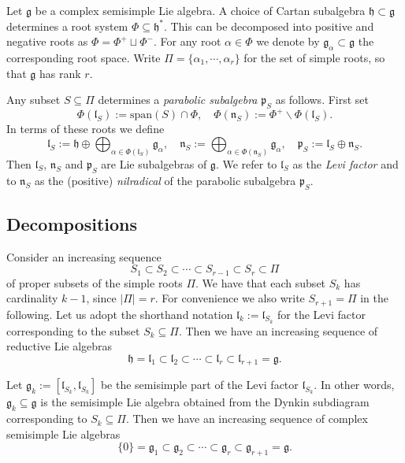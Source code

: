 \documentclass[a4paper, 12pt, reqno, english]{amsart}
\numberwithin{equation}{section}
\numberwithin{figure}{section}
\theoremstyle{plain}
\theoremstyle{plain}
\theoremstyle{plain}
\theoremstyle{plain}
\theoremstyle{plain}
\theoremstyle{definition}
\theoremstyle{definition}
\theoremstyle{definition}
\theoremstyle{remark}
\theoremstyle{definition}
\theoremstyle{definition}
\newcommand{\lieg}{\mathfrak{g}}
\newcommand{\lieh}{\mathfrak{h}}
\newcommand{\liel}{\mathfrak{l}}
\newcommand{\lien}{\mathfrak{n}}
\newcommand{\liep}{\mathfrak{p}}
\newcommand{\roots}{\Phi}
\newcommand{\simpleroots}{\Pi}
\newcommand{\lspan}{\mathrm{span}}
\begin{document}
Let $\lieg$ be a complex semisimple Lie algebra.
A choice of Cartan subalgebra $\lieh \subset \lieg$ determines a root system $\roots \subseteq \lieh^*$.
This can be decomposed into positive and negative roots as $\roots = \roots^+ \sqcup \roots^-$.
For any root $\alpha \in \roots$ we denote by $\lieg_\alpha \subset \lieg$ the corresponding root space.
Write $\simpleroots = \{ \alpha_1, \cdots, \alpha_r \}$ for the set of simple roots, so that $\lieg$ has rank $r$.

Any subset $S \subseteq \simpleroots$ determines a \emph{parabolic subalgebra} $\liep_S$ as follows. First set
\[
\roots(\liel_S) := \lspan(S) \cap \roots, \quad
\roots(\lien_S) := \roots^+ \backslash \roots(\liel_S).
\]
In terms of these roots we define
\[
\liel_S := \lieh \oplus \bigoplus_{\alpha \in \roots(\liel_S)} \lieg_\alpha, \quad
\lien_S := \bigoplus_{\alpha \in \roots(\lien_S)} \lieg_\alpha, \quad
\liep_S := \liel_S \oplus \lien_S.
\]
Then $\liel_S$, $\lien_S$ and $\liep_S$ are Lie subalgebras of $\lieg$.
We refer to $\liel_S$ as the \emph{Levi factor} and to $\lien_S$ as the (positive) \emph{nilradical} of the parabolic subalgebra $\liep_S$.

\subsection{Decompositions}
\label{sec:decompositions}

Consider an increasing sequence
\[
S_1 \subset S_2 \subset \cdots \subset S_{r - 1} \subset S_r \subset \simpleroots
\]
of proper subsets of the simple roots $\simpleroots$.
We have that each subset $S_k$ has cardinality $k - 1$, since $|\Pi| = r$.
For convenience we also write $S_{r + 1} = \simpleroots$ in the following.
Let us adopt the shorthand notation $\liel_k := \liel_{S_k}$ for the Levi factor corresponding to the subset $S_k \subseteq \simpleroots$.
Then we have an increasing sequence of reductive Lie algebras
\begin{equation}
\label{eq:levi-factor-inclusion}
\lieh = \liel_1 \subset \liel_2 \subset \cdots \subset \liel_r \subset \liel_{r + 1} = \lieg.
\end{equation}

Let $\lieg_k := [\liel_{S_k}, \liel_{S_k}]$ be the semisimple part of the Levi factor $\liel_{S_k}$.
In other words, $\lieg_k \subseteq \lieg$ is the semisimple Lie algebra obtained from the Dynkin subdiagram corresponding to $S_k \subseteq \simpleroots$.
Then we have an increasing sequence of complex semisimple Lie algebras
\begin{equation}
\label{eq:lie-algebra-inclusion}
\{0\} = \lieg_1 \subset \lieg_2 \subset \cdots \subset \lieg_r \subset \lieg_{r + 1} = \lieg.
\end{equation}
\end{document}
